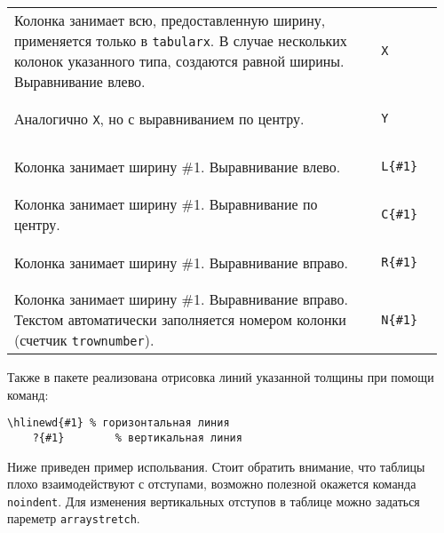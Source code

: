 \noindent
\begin{longtable}{L{0.82\linewidth} S{0.145\linewidth}}
    Колонка занимает всю, предоставленную ширину, применяется только в \texttt{tabularx}. В случае
    нескольких колонок указанного типа, создаются равной ширины. Выравнивание влево. &
        \begin{lstlisting}[style = listtable, gobble = 6, keepspaces = \false]
            X
        \end{lstlisting} \\
    Аналогично \texttt{X}, но с выравниванием по центру. &
        \begin{lstlisting}[style = listtable, gobble = 6, keepspaces = \false]
            Y
        \end{lstlisting} \\
    Колонка занимает ширину \#1. Выравнивание влево. &
        \begin{lstlisting}[style = listtable, gobble = 8, keepspaces = \false]
            L{#1}
        \end{lstlisting} \\
    Колонка занимает ширину \#1. Выравнивание по центру. &
        \begin{lstlisting}[style = listtable, gobble = 8, keepspaces = \false]
            C{#1}
        \end{lstlisting} \\
    Колонка занимает ширину \#1. Выравнивание вправо. &
        \begin{lstlisting}[style = listtable, gobble = 8, keepspaces = \false]
            R{#1}
        \end{lstlisting} \\
    Колонка занимает ширину \#1. Выравнивание вправо. Текстом автоматически заполняется номером колонки
    (счетчик \texttt{trownumber}).  &
        \begin{lstlisting}[style = listtable, gobble = 8, keepspaces = \false]
            N{#1}
        \end{lstlisting} \\
\end{longtable}

Также в пакете реализована отрисовка линий указанной толщины при помощи команд:
\begin{lstlisting}[style = listtable, gobble = 3]
    \hlinewd{#1} % горизонтальная линия
    ?{#1}        % вертикальная линия
\end{lstlisting}

Ниже приведен пример испольвания. Стоит обратить внимание, что таблицы плохо взаимодействуют с отступами,
возможно полезной окажется команда \texttt{noindent}. Для изменения вертикальных отступов в таблице можно
задаться пареметр \texttt{arraystretch}.


